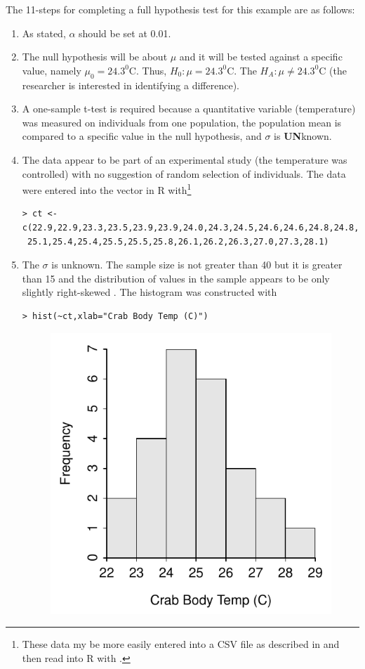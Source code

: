 \documentclass[10pt,openany]{book}\usepackage[]{graphicx}\usepackage[]{color}
\makeatletter
\newenvironment{kframe}{%
 \def\at@end@of@kframe{}%
 \ifinner\ifhmode%
  \def\at@end@of@kframe{\end{minipage}}%
  \begin{minipage}{\columnwidth}%
 \fi\fi%
 \def\FrameCommand##1{\hskip\@totalleftmargin \hskip-\fboxsep
 \colorbox{shadecolor}{##1}\hskip-\fboxsep
     \hskip-\linewidth \hskip-\@totalleftmargin \hskip\columnwidth}%
 \MakeFramed {\advance\hsize-\width
   \@totalleftmargin\z@ \linewidth\hsize
   \@setminipage}}%
 {\par\unskip\endMakeFramed%
 \at@end@of@kframe}
\newenvironment{knitrout}{}{} %
\makeatother
\begin{document}
The 11-steps  for completing a full hypothesis test for this example are as follows:
\begin{enumerate}
    \item As stated, $\alpha$ should be set at 0.01.
    \item The null hypothesis will be about $\mu$ and it will be tested against a specific value, namely $\mu_{0}=24.3^{0}$C.  Thus, $H_{0}:\mu=24.3^{0}$C.  The $H_{A}:\mu\neq24.3^{0}$C (the researcher is interested in identifying a difference).
    \item A one-sample t-test is required because a quantitative variable (temperature) was measured on individuals from one population, the population mean is compared to a specific value in the null hypothesis, and $\sigma$ is \textbf{UN}known.
    \item The data appear to be part of an experimental study (the temperature was controlled) with no suggestion of random selection of individuals.  The data were entered into the  vector in R with\footnote{These data my be more easily entered into a CSV file as described in  and then read into R with .}
\begin{knitrout}
\color{fgcolor}\begin{kframe}
\begin{verbatim}
> ct <- c(22.9,22.9,23.3,23.5,23.9,23.9,24.0,24.3,24.5,24.6,24.6,24.8,24.8,
 25.1,25.4,25.4,25.5,25.5,25.8,26.1,26.2,26.3,27.0,27.3,28.1)
\end{verbatim}
\end{kframe}
\end{knitrout}
    \item The $\sigma$ is unknown.  The sample size is not greater than 40 but it is greater than 15 and the distribution of values in the sample appears to be only slightly right-skewed .  The histogram was constructed with
\begin{knitrout}
\color{fgcolor}\begin{kframe}
\begin{verbatim}
> hist(~ct,xlab="Crab Body Temp (C)")
\end{verbatim}
\end{kframe}\begin{figure}[hbtp]

{\centering \includegraphics[width=.3\linewidth]{Figs/CrabTempHist-1} 

}
\end{figure}
\end{knitrout}
\end{enumerate}
\end{document}
